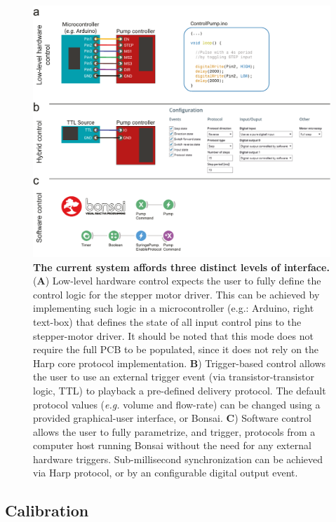 \begin{itemize}
\begin{figure}
	\centering
	\includegraphics[width=1.0\linewidth]{Figures/Artboard 4.pdf}
	\caption{\textbf{The current system affords three distinct levels of interface.}\\
		(\textbf{A}) Low-level hardware control expects the user to fully define the control logic for the stepper motor driver. This can be achieved by implementing such logic in a microcontroller (e.g.: Arduino, right text-box) that defines the state of all input control pins to the stepper-motor driver. It should be noted that this mode does not require the full PCB to be populated, since it does not rely on the Harp core protocol implementation. \textbf{B}) Trigger-based control allows the user to use an external trigger event (via transistor-transistor logic, TTL) to playback a pre-defined delivery protocol. The default protocol values (\textit{e.g.} volume and flow-rate) can be changed using a provided graphical-user interface, or Bonsai. \textbf{C}) Software control allows the user to fully parametrize, and trigger, protocols from a computer host running Bonsai without the need for any external hardware triggers. Sub-millisecond synchronization can be achieved via Harp protocol, or by an configurable digital output event.}
	\label{fig:PumpControl} 
\end{figure}

\end{itemize}

\subsection*{Calibration}
